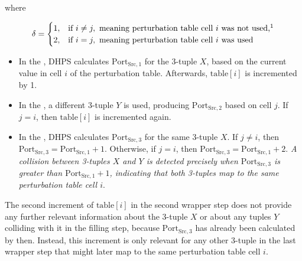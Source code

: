 \documentclass[twocolumn]{report}
\begin{document}
where
\vspace{-1cm}
\begin{center}
	\begin{adjustbox}{max width=\columnwidth}
		\begin{minipage}[t]{0.4\textwidth}
			\[
				\delta =
				\begin{cases}
					1, & \text{if } i \neq j,\ \text{meaning perturbation table cell } i \text{ was not used,}\footnote{\tiny Used or not used in the filling step.} \\
					2, & \text{if } i = j,\ \text{meaning perturbation table cell } i \text{ was used}
				\end{cases}
			\]
		\end{minipage}
	\end{adjustbox}
\end{center}
\begin{itemize}
	\item In the , DHPS calculates \(\text{Port}_{\text{Src},1}\) for the 3-tuple \( X \), based on the current value in cell \( i \) of the perturbation table. Afterwards, \(\text{table}[i]\) is incremented by 1.
	\item In the , a different 3-tuple \( Y \) is used, producing \(\text{Port}_{\text{Src},2}\) based on cell \( j \). If \( j = i \), then \(\text{table}[i]\) is incremented again.
	\item In the , DHPS calculates \(\text{Port}_{\text{Src},3}\) for the same 3-tuple \( X \). If \( j \neq i \), then \(\text{Port}_{\text{Src},3} = \text{Port}_{\text{Src},1} + 1\). Otherwise, if \( j = i \), then \(\text{Port}_{\text{Src},3} = \text{Port}_{\text{Src},1} + 2\). \textit{A collision between 3-tuples \( X \) and \( Y \) is detected precisely when \(\text{Port}_{\text{Src},3}\) is greater than \(\text{Port}_{\text{Src},1} + 1\), indicating that both 3-tuples map to the same perturbation table cell \( i \)}.
\end{itemize}

The second increment of \(\text{table}[i]\) in the second wrapper step does \alert{not provide any further relevant information} about the 3-tuple \( X \) or about any tuples \( Y \) colliding with it in the filling step, because \(\text{Port}_{\text{Src},3}\) has already been calculated by then. Instead, this increment is only relevant for any other 3-tuple in the last wrapper step that might later map to the same perturbation table cell \( i \).
\end{document}
